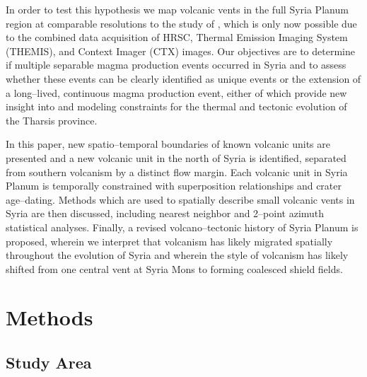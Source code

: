 In order to test this hypothesis we map volcanic vents in the full Syria Planum region at comparable resolutions to the study of \citet{baptista2008swarm}, which is only now possible due to the combined data acquisition of HRSC, Thermal Emission Imaging System (THEMIS), and Context Imager (CTX) images. Our objectives are to determine if multiple separable magma production events occurred in Syria and to assess whether these events can be clearly identified as unique events or the extension of a long--lived, continuous magma production event, either of which provide new insight into and modeling constraints for the thermal and tectonic evolution of the Tharsis province.

In this paper, new spatio--temporal boundaries of known volcanic units are presented and a new volcanic unit in the north of Syria is identified, separated from southern volcanism by a distinct flow margin. Each volcanic unit in Syria Planum is temporally constrained with superposition relationships and crater age--dating. Methods which are used to spatially describe small volcanic vents in Syria are then discussed, including nearest neighbor and 2--point azimuth statistical analyses. Finally, a revised volcano--tectonic history of Syria Planum is proposed, wherein we interpret that volcanism has likely migrated spatially throughout the evolution of Syria and wherein the style of volcanism has likely shifted from one central vent at Syria Mons to forming coalesced shield fields.

\section{Methods}

\subsection{Study Area}

